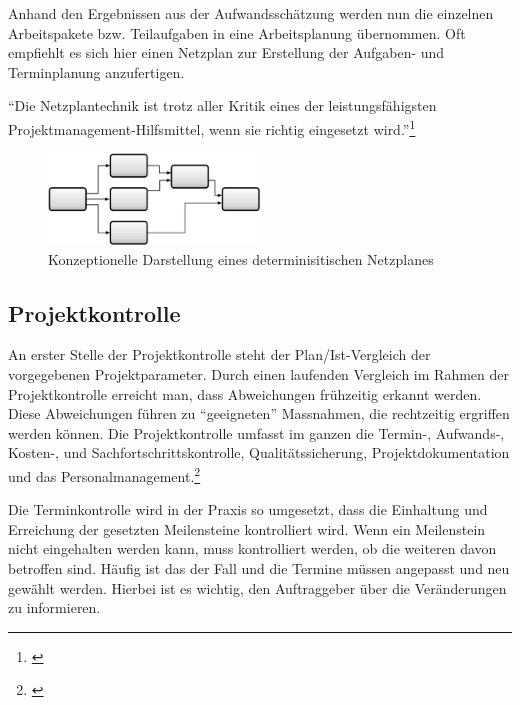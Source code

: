 Anhand den Ergebnissen aus der Aufwandsschätzung werden nun die einzelnen
Arbeitspakete bzw. Teilaufgaben in eine Arbeitsplanung übernommen. Oft empfiehlt
es sich hier einen Netzplan zur Erstellung der Aufgaben- und Terminplanung
anzufertigen. 

``Die Netzplantechnik ist trotz aller Kritik eines der leistungsfähigsten 
Projektmanagement-Hilfsmittel, wenn sie richtig eingesetzt wird.''\footnote{\citealp*[S. 14]{burghardt2007einfuehrung}}

\begin{figure}[htbp]
\begin{center}
\includegraphics[width=0.5\textwidth,angle=0]{./bilder/theorie/03_darstellung_netzplan.pdf}
\caption[Konzeptionelle Darstellung eines determinisitischen Netzplanes]{Konzeptionelle 
    Darstellung eines determinisitischen Netzplanes\footnotemark}
\label{pic:03_darstellung_netzplan}
\end{center}
\end{figure}


\subsection{Projektkontrolle}
An erster Stelle der Projektkontrolle steht der Plan/Ist-Vergleich der vorgegebenen
Projektparameter. Durch einen laufenden Vergleich im Rahmen der Projektkontrolle
erreicht man, dass Abweichungen frühzeitig erkannt werden. Diese Abweichungen
führen zu ``geeigneten'' Massnahmen, die rechtzeitig ergriffen werden können.
Die Projektkontrolle umfasst im ganzen die Termin-, Aufwands-, Kosten-, 
und Sachfortschrittskontrolle, Qualitätssicherung, Projektdokumentation und
das Personalmanagement.\footnote{\citealp*[Vgl.][S. 15]{burghardt2007einfuehrung}}

Die Terminkontrolle wird in der Praxis so umgesetzt, dass die Einhaltung
und Erreichung der gesetzten Meilensteine kontrolliert wird. Wenn ein 
Meilenstein nicht eingehalten werden kann, muss kontrolliert werden, ob die
weiteren davon betroffen sind. Häufig ist das der Fall und die Termine
müssen angepasst und neu gewählt werden. Hierbei ist es wichtig, den Auftraggeber
über die Veränderungen zu informieren.

